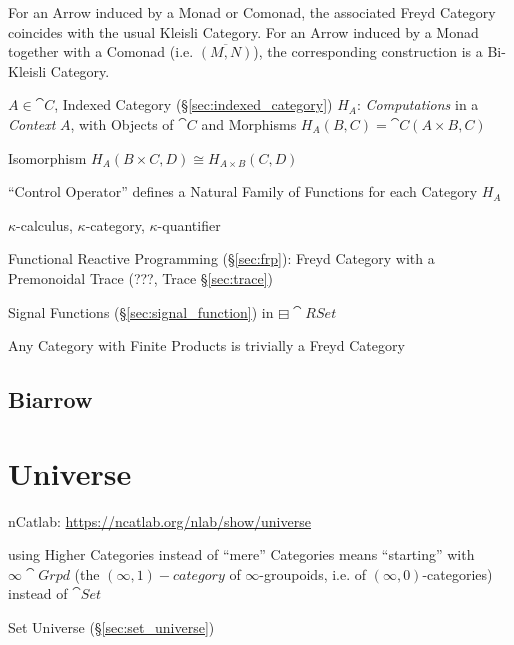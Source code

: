 For an Arrow induced by a Monad or Comonad, the associated Freyd
Category coincides with the usual Kleisli Category. For an Arrow
induced by a Monad together with a Comonad (i.e. $\overline{(M,N)}$),
the corresponding construction is a Bi-Kleisli Category.
\cite{jacobs-heunen-hasuo09}

$A \in \cat{C}$, Indexed Category (\S\ref{sec:indexed_category})
$H_A$: \emph{Computations} in a \emph{Context} $A$, with Objects of
$\cat{C}$ and Morphisms $H_A(B,C) = \cat{C}(A \times B, C)$

Isomorphism $H_A(B \times C, D) \cong H_{A \times B} (C,D)$

``Control Operator'' defines a Natural Family of Functions for each
Category $H_A$
\cite{paterson01}

$\kappa$-calculus, $\kappa$-category, $\kappa$-quantifier %

Functional Reactive Programming (\S\ref{sec:frp}): Freyd Category with
a Premonoidal Trace (???, Trace \S\ref{sec:trace})

Signal Functions (\S\ref{sec:signal_function}) in
$\boxminus\cat{RSet}$ \cite{jeffrey12}

Any Category with Finite Products is trivially a Freyd Category
\cite{jeffrey12}



\subsection{Biarrow}\label{sec:biarrow}



\section{Universe}\label{sec:category_universe}

nCatlab: \url{https://ncatlab.org/nlab/show/universe}

using Higher Categories instead of ``mere'' Categories means
``starting'' with $\infty\cat{Grpd}$ (the $(\infty,1)-category$ of
$\infty$-groupoids, i.e. of $(\infty,0)$-categories) instead of
$\cat{Set}$

\fist Set Universe (\S\ref{sec:set_universe})

